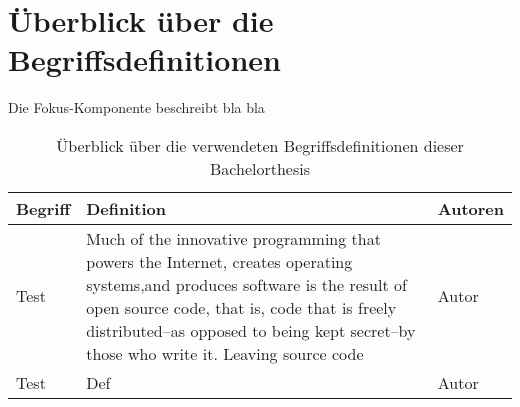 \clearpage
\chapter*{Überblick über die Begriffsdefinitionen}	
Die Fokus-Komponente beschreibt bla bla

\begin{table*}[h!]
	\centering
	
	\begin{tabular}{@{}lp{6.5cm}l@{}}\toprule[1.5pt]
		
		\textbf{Begriff} & \textbf{Definition} & \textbf{Autoren} \\ \midrule
		Test     & Much of the innovative programming that powers the Internet, creates operating systems,and produces software is the result of open source code, that is, code that is freely distributed--as opposed to being kept secret--by those who write it. Leaving source code  & Autor           \\
				
		Test                      & Def                 & Autor           \\
		
	\bottomrule[1.5pt]
	\end{tabular}

	\caption{Überblick über die verwendeten Begriffsdefinitionen dieser Bachelorthesis}
	\label{tab:definitionen}

\end{table*}
